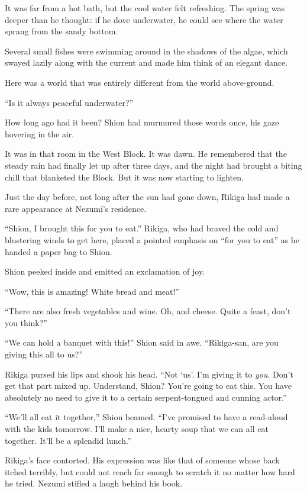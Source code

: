 It was far from a hot bath, but the cool water felt refreshing. The
spring was deeper than he thought: if he dove underwater, he could see
where the water sprang from the sandy bottom.

Several small fishes were swimming around in the shadows of the algae,
which swayed lazily along with the current and made him think of an
elegant dance.

Here was a world that was entirely different from the world
above-ground.

``Is it always peaceful underwater?''

How long ago had it been? Shion had murmured those words once, his gaze
hovering in the air.

\mybreak

It was in that room in the West Block. It was dawn. He remembered that
the steady rain had finally let up after three days, and the night had
brought a biting chill that blanketed the Block. But it was now starting
to lighten.

Just the day before, not long after the sun had gone down, Rikiga had
made a rare appearance at Nezumi's residence.

``Shion, I brought this for you to eat.'' Rikiga, who had braved the
cold and blustering winds to get here, placed a pointed emphasis on
``for you to eat'' as he handed a paper bag to Shion.

Shion peeked inside and emitted an exclamation of joy.

``Wow, this is amazing! White bread and meat!''

``There are also fresh vegetables and wine. Oh, and cheese. Quite a
feast, don't you think?''

``We can hold a banquet with this!'' Shion said in awe. ``Rikiga-san,
are you giving this all to us?''

Rikiga pursed his lips and shook his head. ``Not `us'. I'm giving it to
\emph{you}. Don't get that part mixed up. Understand, Shion? You're going to
eat this. You have absolutely no need to give it to a certain
serpent-tongued and cunning actor.''

``We'll all eat it together,'' Shion beamed. ``I've promised to have a
read-aloud with the kids tomorrow. I'll make a nice, hearty soup that we
can all eat together. It'll be a splendid lunch.''

Rikiga's face contorted. His expression was like that of someone whose
back itched terribly, but could not reach far enough to scratch it no
matter how hard he tried. Nezumi stifled a laugh behind his book.

